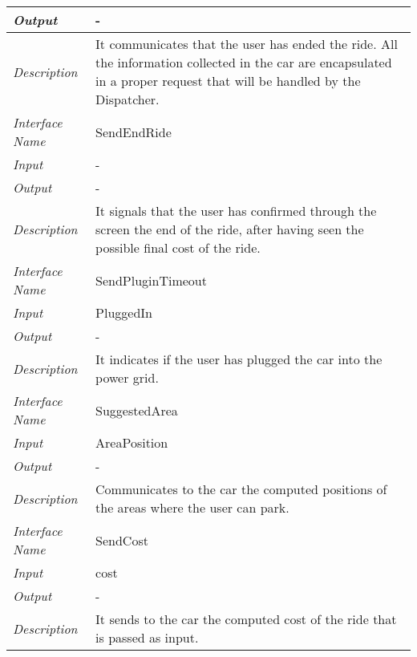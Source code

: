 \begin{longtable}{|>{\em}l|X|}
	\hline
	Output & -\\
	\hline
	Description &It communicates that the user has ended the ride. All the information collected in the car are encapsulated in a proper request that will be handled by the Dispatcher.\\
	\hline
	\hline
	Interface Name& SendEndRide\\
	\hline
	Input & -\\
	\hline
	Output & -\\
	\hline
	Description &It signals that the user has confirmed through the screen the end of the ride, after having seen the possible final cost of the ride.\\
	\hline
	\hline
	Interface Name& SendPluginTimeout\\
	\hline
	Input & PluggedIn\\
	\hline
	Output & -\\
	\hline
	Description &It indicates if the user has plugged the car into the power grid.\\
	\hline
	\hline
	Interface Name& SuggestedArea\\
	\hline
	Input &AreaPosition\\
	\hline
	Output & -\\
	\hline
	Description &Communicates to the car the computed positions of the areas where the user can park.\\
	\hline
	\hline
	Interface Name& SendCost\\
	\hline
	Input &cost\\
	\hline
	Output & -\\
	\hline
	Description &It sends to the car the computed cost of the ride that is passed as input.\\
	\hline
\end{longtable}   